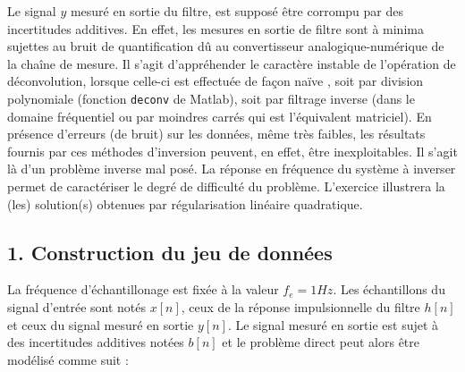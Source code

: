 \documentclass{article}
\begin{document}
Le signal $y$ mesuré en sortie du filtre, est supposé être corrompu par des incertitudes additives. En effet, les mesures en sortie de filtre sont à minima sujettes au bruit de quantification dû au convertisseur analogique-numérique de la chaîne de mesure. Il s’agit d’appréhender le caractère instable de l’opération de déconvolution, lorsque celle-ci est effectuée de façon \guillemotleft naïve \guillemotright, soit par division polynomiale (fonction \texttt{deconv} de Matlab), soit par filtrage inverse (dans le domaine fréquentiel ou par moindres carrés qui est l’équivalent
matriciel). 
%
En présence d’erreurs (de bruit) sur les données, même très faibles, les résultats fournis par ces méthodes d’inversion peuvent, en effet, être inexploitables. Il s’agit là d’un problème inverse mal posé. La réponse en fréquence du système à inverser permet de caractériser le degré de difficulté du problème. L’exercice illustrera la (les) solution(s) obtenues par régularisation linéaire quadratique.


\subsection*{1. Construction du jeu de données}

La fréquence d'échantillonage est fixée à la valeur $f_e = 1 Hz$. Les échantillons du signal d’entrée sont notés $x[n]$, ceux de la réponse impulsionnelle du filtre $h[n]$ et ceux du signal mesuré en sortie $y[n]$. Le signal mesuré en sortie est sujet à des incertitudes additives notées $b[n]$ et le problème direct peut alors être modélisé comme suit :

\end{document}
